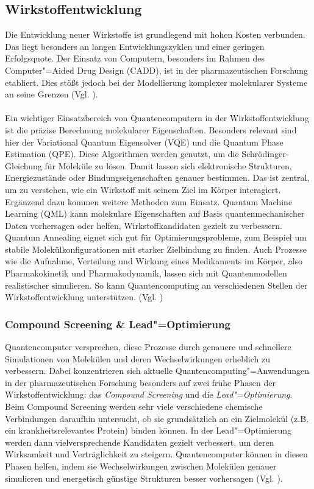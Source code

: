 \subsection{Wirkstoffentwicklung}
Die Entwicklung neuer Wirkstoffe ist grundlegend mit hohen Kosten verbunden. Das liegt besonders an langen Entwicklungszyklen und einer geringen Erfolgsquote. Der Einsatz von Computern, besonders im Rahmen des Computer"=Aided Drug Design (CADD), ist in der pharmazeutischen Forschung etabliert. Dies stößt jedoch bei der Modellierung komplexer molekularer Systeme an seine Grenzen (Vgl. \cite{bertl_quantum_2025}).\\
\\
Ein wichtiger Einsatzbereich von Quantencomputern in der Wirkstoffentwicklung ist die präzise Berechnung molekularer Eigenschaften. Besonders relevant sind hier der Variational Quantum Eigensolver (VQE) und die Quantum Phase Estimation (QPE). Diese Algorithmen werden genutzt, um die Schrödinger-Gleichung für Moleküle zu lösen. Damit lassen sich elektronische Strukturen, Energiezustände oder Bindungseigenschaften genauer bestimmen. Das ist zentral, um zu verstehen, wie ein Wirkstoff mit seinem Ziel im Körper interagiert. Ergänzend dazu kommen weitere Methoden zum Einsatz. Quantum Machine Learning (QML) kann molekulare Eigenschaften auf Basis quantenmechanischer Daten vorhersagen oder helfen, Wirkstoffkandidaten gezielt zu verbessern. Quantum Annealing eignet sich gut für Optimierungsprobleme, zum Beispiel um stabile Molekülkonfigurationen mit starker Zielbindung zu finden. Auch Prozesse wie die Aufnahme, Verteilung und Wirkung eines Medikaments im Körper, also Pharmakokinetik und Pharmakodynamik, lassen sich mit Quantenmodellen realistischer simulieren. So kann Quantencomputing an verschiedenen Stellen der Wirkstoffentwicklung unterstützen. (Vgl. \cite{bertl_quantum_2025})

\subsubsection*{Compound Screening \& Lead"=Optimierung}
Quantencomputer versprechen, diese Prozesse durch genauere und schnellere Simulationen von Molekülen und deren Wechselwirkungen erheblich zu verbessern. Dabei konzentrieren sich aktuelle Quantencomputing"=Anwendungen in der pharmazeutischen Forschung besonders auf zwei frühe Phasen der Wirkstoffentwicklung: das \textit{Compound Screening} und die \textit{Lead"=Optimierung}. Beim Compound Screening werden sehr viele verschiedene chemische Verbindungen daraufhin untersucht, ob sie grundsätzlich an ein Zielmolekül (z.B. ein krankheitsrelevantes Protein) binden können. In der Lead"=Optimierung werden dann vielversprechende Kandidaten gezielt verbessert, um deren Wirksamkeit und Verträglichkeit zu steigern. Quantencomputer können in diesen Phasen helfen, indem sie Wechselwirkungen zwischen Molekülen genauer simulieren und energetisch günstige Strukturen besser vorhersagen (Vgl. \cite{zinner_quantum_2021}).

